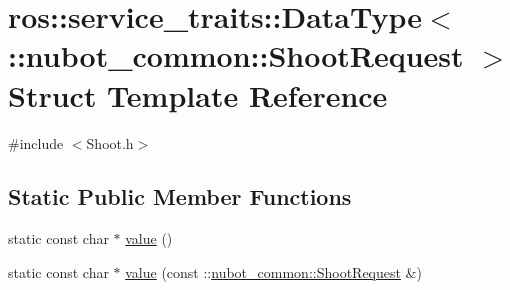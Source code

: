 \hypertarget{structros_1_1service__traits_1_1DataType_3_01_1_1nubot__common_1_1ShootRequest_01_4}{\section{ros\-:\-:service\-\_\-traits\-:\-:Data\-Type$<$ \-:\-:nubot\-\_\-common\-:\-:Shoot\-Request $>$ Struct Template Reference}
\label{structros_1_1service__traits_1_1DataType_3_01_1_1nubot__common_1_1ShootRequest_01_4}
}


{\ttfamily \#include $<$Shoot.\-h$>$}

\subsection*{Static Public Member Functions}
\begin{DoxyCompactItemize}
\item 
static const char $\ast$ \hyperlink{structros_1_1service__traits_1_1DataType_3_01_1_1nubot__common_1_1ShootRequest_01_4_a461c15d21b45417c3dddc4b67c0fae92}{value} ()
\item 
static const char $\ast$ \hyperlink{structros_1_1service__traits_1_1DataType_3_01_1_1nubot__common_1_1ShootRequest_01_4_a27cf0027e506e9006669b86143d019ac}{value} (const \-::\hyperlink{namespacenubot__common_ab115c969a87ffc5940d2f26488a5baa3}{nubot\-\_\-common\-::\-Shoot\-Request} \&)
\end{DoxyCompactItemize}


